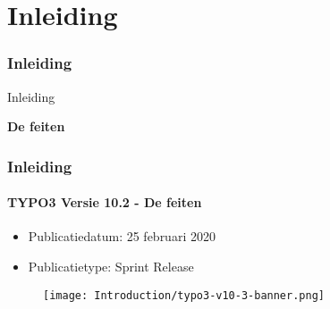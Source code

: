 %

\section{Inleiding}
\begin{frame}[fragile]
	\frametitle{Inleiding}

	\begin{center}\huge{Inleiding}\end{center}
	\begin{center}\huge{\color{typo3darkgrey}\textbf{De feiten}}\end{center}

\end{frame}


\begin{frame}[fragile]
	\frametitle{Inleiding}
	\framesubtitle{TYPO3 Versie 10.2 - De feiten}

	\begin{itemize}
		\item Publicatiedatum: 25 februari 2020
		\item Publicatietype: Sprint Release
	\end{itemize}

	\begin{figure}
		\texttt{[image: Introduction/typo3-v10-3-banner.png]}
	\end{figure}

\end{frame}


